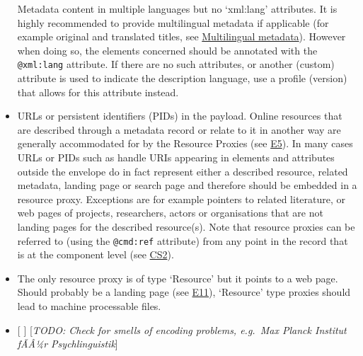 \documentclass[]{article}
\begin{document}
\begin{itemize}
  Metadata content in multiple languages but no `xml:lang' attributes.
  It is highly recommended to provide multilingual metadata if
  applicable (for example original and translated titles, see
  \href{../common_approachesproblems/multilingual_metadata.md}{Multilingual
  metadata}). However when doing so, the elements concerned should be
  annotated with the \texttt{@xml:lang} attribute. If there are no such
  attributes, or another (custom) attribute is used to indicate the
  description language, use a profile (version) that allows for this
  attribute instead.
\item
  URLs or persistent identifiers (PIDs) in the payload. Online resources
  that are described through a metadata record or relate to it in
  another way are generally accommodated for by the Resource Proxies
  (see
  \href{/authoring_component_metadata_records/the_envelope.md\#e5}{E5}).
  In many cases URLs or PIDs such as handle URIs appearing in elements
  and attributes outside the envelope do in fact represent either a
  described resource, related metadata, landing page or search page and
  therefore should be embedded in a resource proxy. Exceptions are for
  example pointers to related literature, or web pages of projects,
  researchers, actors or organisations that are not landing pages for
  the described resource(s). Note that resource proxies can be referred
  to (using the \texttt{@cmd:ref} attribute) from any point in the
  record that is at the component level (see
  \href{/authoring_component_metadata_records/the_component_section.md\#cs2}{CS2}).
\item
  The only resource proxy is of type `Resource' but it points to a web
  page. Should probably be a landing page (see
  \href{/authoring_component_metadata_records/the_envelope.md\#e11}{E11}),
  `Resource' type proxies should lead to machine processable files.
\item
  {[} {]} {[}\emph{TODO: Check for smells of encoding problems, e.g.~Max
  Planck Institut fÃÂ¼r Psychlinguistik}{]}
\end{itemize}
\end{document}
